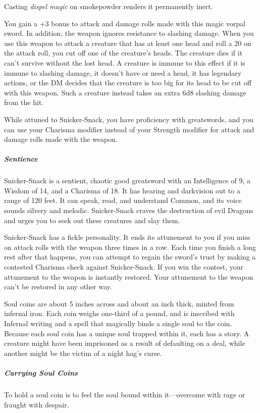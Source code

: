 \documentclass[10pt,a4paper,twoside,bg=print,twocolumn,openany,nodeprecatedcode]{dndbook}
\begin{document}
Casting \textit{dispel magic} on smokepowder renders it permanently inert.

You gain a +3 bonus to attack and damage rolls made with this magic vorpal sword. In addition, the weapon ignores resistance to slashing damage. When you use this weapon to attack a creature that has at least one head and roll a 20 on the attack roll, you cut off one of the creature's heads. The creature dies if it can't survive without the lost head. A creature is immune to this effect if it is immune to slashing damage, it doesn't have or need a head, it has legendary actions, or the DM decides that the creature is too big for its head to be cut off with this weapon. Such a creature instead takes an extra 6d8 slashing damage from the hit.

While attuned to Snicker-Snack, you have proficiency with greatswords, and you can use your Charisma modifier instead of your Strength modifier for attack and damage rolls made with the weapon.

\subparagraph{Sentience}
Snicker-Snack is a sentient, chaotic good greatsword with an Intelligence of 9, a Wisdom of 14, and a Charisma of 18. It has hearing and darkvision out to a range of 120 feet. It can speak, read, and understand Common, and its voice sounds silvery and melodic. Snicker-Snack craves the destruction of evil Dragons and urges you to seek out these creatures and slay them.

Snicker-Snack has a fickle personality. It ends its attunement to you if you miss on attack rolls with the weapon three times in a row. Each time you finish a long rest after that happens, you can attempt to regain the sword's trust by making a contested Charisma check against Snicker-Snack. If you win the contest, your attunement to the weapon is instantly restored. Your attunement to the weapon can't be restored in any other way.

Soul coins are about 5 inches across and about an inch thick, minted from infernal iron. Each coin weighs one-third of a pound, and is inscribed with Infernal writing and a spell that magically binds a single soul to the coin. Because each soul coin has a unique soul trapped within it, each has a story. A creature might have been imprisoned as a result of defaulting on a deal, while another might be the victim of a night hag's curse.

\subparagraph{Carrying Soul Coins}
To hold a soul coin is to feel the soul bound within it—overcome with rage or fraught with despair.
\end{document}
